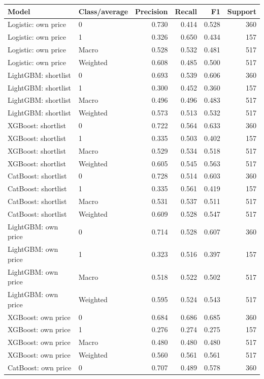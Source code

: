 \begin{longtable}{@{}p{.34\linewidth}p{.15\linewidth}rrrr@{}}
\toprule Model & Class/average & Precision & Recall & F1 & Support\\\midrule\endhead
Logistic: own price & 0 & 0.730 & 0.414 & 0.528 & 360\\
Logistic: own price & 1 & 0.326 & 0.650 & 0.434 & 157\\
Logistic: own price & Macro & 0.528 & 0.532 & 0.481 & 517\\
Logistic: own price & Weighted & 0.608 & 0.485 & 0.500 & 517\\
LightGBM: shortlist & 0 & 0.693 & 0.539 & 0.606 & 360\\
LightGBM: shortlist & 1 & 0.300 & 0.452 & 0.360 & 157\\
LightGBM: shortlist & Macro & 0.496 & 0.496 & 0.483 & 517\\
LightGBM: shortlist & Weighted & 0.573 & 0.513 & 0.532 & 517\\
XGBoost: shortlist & 0 & 0.722 & 0.564 & 0.633 & 360\\
XGBoost: shortlist & 1 & 0.335 & 0.503 & 0.402 & 157\\
XGBoost: shortlist & Macro & 0.529 & 0.534 & 0.518 & 517\\
XGBoost: shortlist & Weighted & 0.605 & 0.545 & 0.563 & 517\\
CatBoost: shortlist & 0 & 0.728 & 0.514 & 0.603 & 360\\
CatBoost: shortlist & 1 & 0.335 & 0.561 & 0.419 & 157\\
CatBoost: shortlist & Macro & 0.531 & 0.537 & 0.511 & 517\\
CatBoost: shortlist & Weighted & 0.609 & 0.528 & 0.547 & 517\\
LightGBM: own price & 0 & 0.714 & 0.528 & 0.607 & 360\\
LightGBM: own price & 1 & 0.323 & 0.516 & 0.397 & 157\\
LightGBM: own price & Macro & 0.518 & 0.522 & 0.502 & 517\\
LightGBM: own price & Weighted & 0.595 & 0.524 & 0.543 & 517\\
XGBoost: own price & 0 & 0.684 & 0.686 & 0.685 & 360\\
XGBoost: own price & 1 & 0.276 & 0.274 & 0.275 & 157\\
XGBoost: own price & Macro & 0.480 & 0.480 & 0.480 & 517\\
XGBoost: own price & Weighted & 0.560 & 0.561 & 0.561 & 517\\
CatBoost: own price & 0 & 0.707 & 0.489 & 0.578 & 360\\

\end{longtable}
